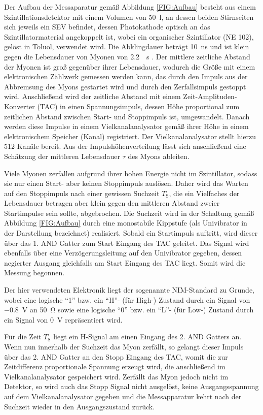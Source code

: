 Der Aufbau der Messaparatur gemäß Abbildung \ref{FIG:Aufbau} besteht aus einem Szintillationsdetektor mit einem Volumen von \SI{50}{l}, an dessen beiden Stirnseiten sich jeweils ein SEV befindet, dessen Photokathode optisch an das Szintillatormaterial angekoppelt ist, wobei ein organischer Szintillator (NE  102), gelöst in Toluol, verwendet wird. Die Abklingdauer beträgt \SI{10}{ns} und ist klein gegen die Lebensdauer von Myonen von \SI{2,2}{\micro{}s} \cite{PDG}. Der mittlere zeitliche Abstand der Myonen ist groß gegenüber ihrer Lebensdauer, wodurch die Größe mit einem elektronischen Zählwerk gemessen werden kann, das durch den Impuls aus der Abbremsung des Myons gestartet wird und durch den Zerfallsimpuls gestoppt wird. Anschließend wird der zeitliche Abstand mit einem Zeit-Amplituden-Konverter (TAC) in einen Spannungsimpuls, dessen Höhe proportional zum zeitlichen Abstand zwischen Start- und Stoppimpuls ist, umgewandelt. Danach werden diese Impulse in einem Vielkanalanalysator gemäß ihrer Höhe in einem elektronischem Speicher (Kanal) registriert. Der Vielkanalanalysator stellt hierzu 512 Kanäle bereit. Aus der Impulshöhenverteilung lässt sich anschließend  eine Schätzung der mittleren Lebensdauer $\tau$ des Myons ableiten.

Viele Myonen zerfallen aufgrund ihrer hohen Energie nicht im Szintillator, sodass sie nur einen Start- aber keinen Stoppimpuls auslösen. Daher wird das Warten auf den Stopp\-impuls nach einer gewissen Suchzeit $T_{\textrm{S}}$, die ein Vielfaches der Lebensdauer betragen aber klein gegen den mittleren Abstand zweier Startimpulse sein sollte, abgebrochen. Die Suchzeit wird in der Schaltung gemäß Abbildung \ref{FIG:Aufbau} durch eine monostabile Kippstufe (als Univibrator in der Darstellung bezeichnet) realisiert. Sobald ein Startimpuls auftritt, wird dieser über das 1. AND Gatter zum Start Eingang des TAC geleitet. Das Signal wird ebenfalls über eine Verzögerungsleitung auf den Univibrator gegeben, dessen negierter Ausgang gleichfalls am Start Eingang des TAC liegt. Somit wird die Messung begonnen.

Der hier verwendeten Elektronik liegt der sogenannte NIM-Standard zu Grunde, wobei eine logische "`1"' bzw. ein "`H"'- (für High-) Zustand durch ein Signal von \SI{-0,8}{V} an \SI{50}{\ohm} sowie eine logische "`0"' bzw. ein "`L"'- (für Low-) Zustand durch ein Signal von \SI{0}{V} repräsentiert wird.

Für die Zeit $T_{\textrm{S}}$ liegt ein H-Signal am einen Eingang des 2. AND Gatters an. Wenn nun innerhalb der Suchzeit das Myon zerfällt, so gelangt dieser Impuls über das 2. AND Gatter an den Stopp Eingang des TAC, womit die zur Zeitdifferenz proportionale Spannung erzeugt wird, die anschließend im Vielkanalanalysator gespeichert wird. Zerfällt das Myon jedoch nicht im Detektor, so wird auch das Stopp Signal nicht ausgelöst, keine Ausgangsspannung auf dem Vielkanalanalysator gegeben und die Messapparatur kehrt nach der Suchzeit wieder in den Ausgangszustand zurück.

